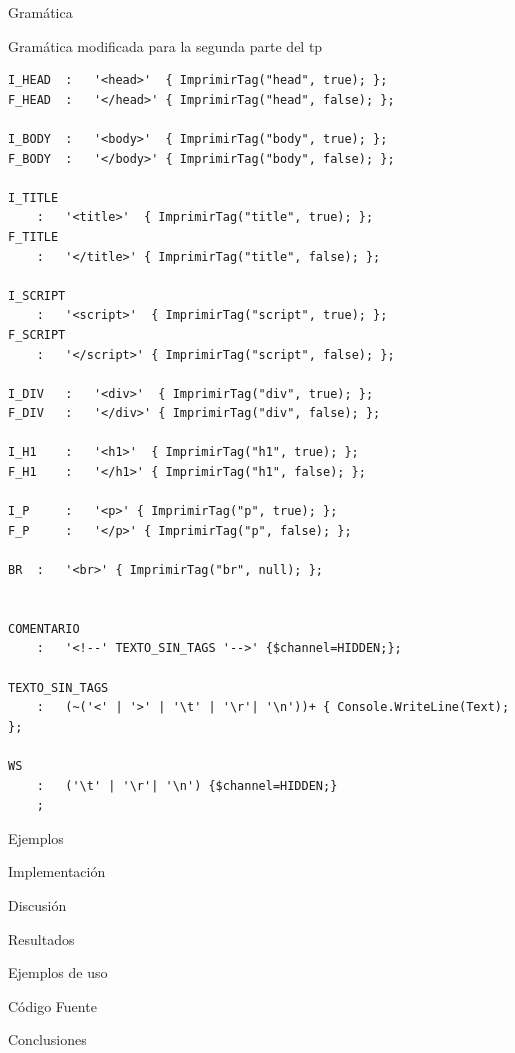 \documentclass[a4paper,8pt]{article}
\begin{document}
\begin{section}{Gramática}
\begin{subsection}{Gramática modificada para la segunda parte del tp}
\begin{verbatim}
I_HEAD 	:	'<head>'  { ImprimirTag("head", true); };
F_HEAD 	:	'</head>' { ImprimirTag("head", false); };

I_BODY 	:	'<body>'  { ImprimirTag("body", true); };
F_BODY 	:	'</body>' { ImprimirTag("body", false); };

I_TITLE
 	:	'<title>'  { ImprimirTag("title", true); };
F_TITLE 
	:	'</title>' { ImprimirTag("title", false); };
	
I_SCRIPT
 	:	'<script>'  { ImprimirTag("script", true); };
F_SCRIPT 
	:	'</script>' { ImprimirTag("script", false); };
	
I_DIV 	:	'<div>'  { ImprimirTag("div", true); };
F_DIV 	:	'</div>' { ImprimirTag("div", false); };
	
I_H1 	:	'<h1>'  { ImprimirTag("h1", true); };
F_H1 	:	'</h1>' { ImprimirTag("h1", false); };
	
I_P 	:	'<p>' { ImprimirTag("p", true); };
F_P 	:	'</p>' { ImprimirTag("p", false); };

BR 	:	'<br>' { ImprimirTag("br", null); };


COMENTARIO 
	:	'<!--' TEXTO_SIN_TAGS '-->' {$channel=HIDDEN;};

TEXTO_SIN_TAGS 
	:	(~('<' | '>' | '\t' | '\r'| '\n'))+ { Console.WriteLine(Text); };
	
WS 
    :   ('\t' | '\r'| '\n') {$channel=HIDDEN;}
    ;

 \end{verbatim} 

 \begin{subsubsection}{Ejemplos}
  
 \end{subsubsection}

\end{subsection}
\end{section}
\newpage
\begin{section}{Implementación}
\begin{subsection}{Discusión}
\end{subsection}
\begin{subsection}{Resultados}

\end{subsection}
\begin{subsection}{Ejemplos de uso}

\end{subsection}
\begin{subsection}{Código Fuente}

\end{subsection}
\end{section}
\newpage
\begin{section}{Conclusiones}
 
\end{section}
\newpage
\end{document}

